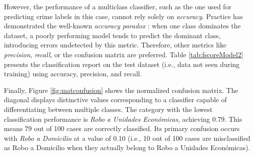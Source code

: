 \documentclass[onecolumn, journal, english, 12pt, a4paper]{IEEEtran} %
\theoremstyle{definition}
\begin{document}
However, the performance of a multiclass classifier, such as the one
used for predicting crime labels in this case, cannot rely solely on
\emph{accuracy}. Practice has demonstrated the well-known
\emph{accuracy paradox} \cite{abma2009evaluation}: when
one class dominates the dataset, a poorly performing model tends to
predict the dominant class, introducing errors undetected by this
metric. Therefore, other metrics like \emph{precision}, \emph{recall},
or the confusion matrix are preferred. Table \ref{tab:fscoreModel2}
presents the classification report on the test dataset (i.e., data not
seen during training) using accuracy, precision, and recall.

Finally, Figure \ref{fig:matconfusion} shows the normalized confusion
matrix. The diagonal displays distinctive values corresponding to a
classifier capable of differentiating between multiple classes. The
category with the lowest classification performance is \emph{Robo a
  Unidades Económicas}, achieving 0.79. This means 79 out of 100 cases
are correctly classified. Its primary confusion occurs with \emph{Robo
  a Domicilio} at a value of 0.10 (i.e., 10 out of 100 cases are
misclassified as Robo a Domicilio when they actually belong to Robo a
Unidades Económicas).
\end{document}
